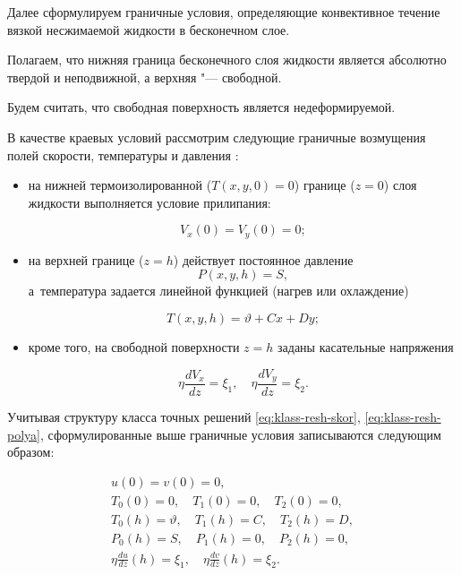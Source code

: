 




Далее сформулируем граничные условия, определяющие конвективное течение вязкой несжимаемой жидкости в бесконечном слое. 

Полагаем, что нижняя граница бесконечного слоя жидкости является абсолютно твердой и неподвижной, а верхняя "--- свободной. 

Будем считать, что свободная поверхность является недеформируемой.



В качестве краевых условий рассмотрим следующие граничные возмущения полей скорости, температуры и давления \cite{Burm_Pros_Samara}:

\begin{itemize}

\item на нижней термоизолированной ($T(x,y,0)=0$) границе ($z=0$) слоя жидкости выполняется условие прилипания:

$$V_x (0)=V_y (0)=0;$$

\item на верхней границе ($z=h$) действует постоянное давление $${P(x,y,h)=S},$$ а~температура задается линейной функцией (нагрев или охлаждение)

$$T(x,y,h)=\vartheta+Cx+Dy;$$

\item кроме того, на свободной поверхности $z=h$ заданы касательные напряжения

$$\eta \displaystyle \frac{d V_x}{dz}=\xi_1, \quad \eta \displaystyle \frac{d V_y}{dz}=\xi_2.$$

\end{itemize}



Учитывая структуру класса точных решений \eqref{eq:klass-resh-skor},  \eqref{eq:klass-resh-polya}, сформулированные выше граничные условия записываются следующим образом:

\begin{gather}

u(0)=v(0)=0,\\

T_0(0)=0, \quad T_1(0)=0, \quad T_2(0)=0,\\

T_0(h)=\vartheta, \quad T_1(h)=C, \quad T_2(h)=D,\\

P_0(h)=S, \quad P_1(h)=0, \quad P_2(h)=0,\\

\displaystyle \eta\frac{du}{dz}(h)=\xi_1, \quad \eta\frac{dv}{dz}(h)=\xi_2.

\end{gather}

